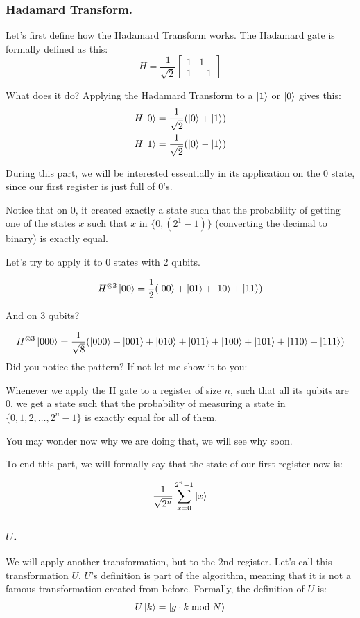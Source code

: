 
\subsubsection{Hadamard Transform.}
Let’s first define how the Hadamard Transform works. The Hadamard gate is formally defined as this:
$$
H = \frac{1}{\sqrt{2}} 
\begin{bmatrix}
1 & 1 \\
1 & -1
\end{bmatrix}
$$

What does it do? Applying the Hadamard Transform to a $\ket{1}$ or $\ket{0}$ gives this:
\begin{align*}
H\ket{0} = \frac{1}{\sqrt{2}}(\ket{0} + \ket{1})\\
H\ket{1} = \frac{1}{\sqrt{2}}(\ket{0} - \ket{1})
\end{align*}

During this part, we will be interested essentially in its application on the 0 state, since our first register is just full of 0’s.

Notice that on 0, it created exactly a state such that the probability of getting one of the states $x$ such that $x$ in $\{0, (2^1 - 1)\}$ (converting the decimal to binary) is exactly equal.

Let’s try to apply it to 0 states with 2 qubits.

$$
H^{\otimes 2} \ket{00} = \frac{1}{2}(\ket{00} + \ket{01} + \ket{10} + \ket{11})
$$

And on 3 qubits?

$$
H^{\otimes 3} \ket{000} = \frac{1}{\sqrt{8}} (\ket{000} + \ket{001} + \ket{010} + \ket{011} + \ket{100} + \ket{101} + \ket{110} + \ket{111})
$$
Did you notice the pattern? If not let me show it to you:

Whenever we apply the H gate to a register of size $n$, such that all its qubits are $0$, we get a state such that the probability of measuring a state in $\{0, 1, 2, \ldots, 2^n - 1\}$ is exactly equal for all of them.

You may wonder now why we are doing that, we will see why soon.

To end this part, we will formally say that the state of our first register now is:

$$
\frac{1}{\sqrt{2^n}} \sum_{x=0}^{2^n - 1} \ket{x}
$$
\subsubsection{$U$.}
We will apply another transformation, but to the 2nd register. Let’s call this transformation $U$. $U$’s definition is part of the algorithm, meaning that it is not a famous transformation created from before. Formally, the definition of $U$ is:
$$
U\ket{k} = \ket{g \cdot k \bmod N}
$$

